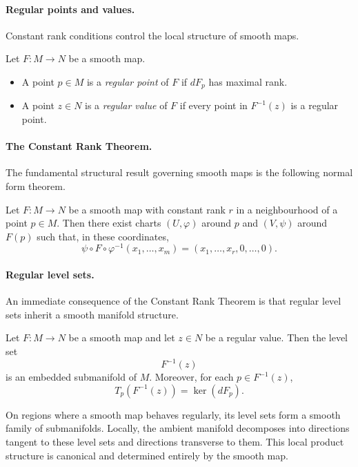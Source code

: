 \paragraph{Regular points and values.}
Constant rank conditions control the local structure of smooth maps.

\begin{gdefn}
Let $F:M\to N$ be a smooth map.
\begin{itemize}
\item A point $p\in M$ is a \emph{regular point} of $F$ if $dF_p$ has maximal rank.
\item A point $z\in N$ is a \emph{regular value} of $F$ if every point in $F^{-1}(z)$
is a regular point.
\end{itemize}
\end{gdefn}

\paragraph{The Constant Rank Theorem.}
The fundamental structural result governing smooth maps is the following normal form
theorem.

\begin{gthm}
Let $F:M\to N$ be a smooth map with constant rank $r$ in a neighbourhood of a point
$p\in M$.
Then there exist charts $(U,\varphi)$ around $p$ and $(V,\psi)$ around $F(p)$ such that,
in these coordinates,
\[
\psi\circ F\circ \varphi^{-1}(x_1,\dots,x_m)
=
(x_1,\dots,x_r,0,\dots,0).
\]
\end{gthm}


\paragraph{Regular level sets.}
An immediate consequence of the Constant Rank Theorem is that regular level sets inherit
a smooth manifold structure.

\begin{gprop}
Let $F:M\to N$ be a smooth map and let $z\in N$ be a regular value.
Then the level set
\[
F^{-1}(z)
\]
is an embedded submanifold of $M$.
Moreover, for each $p\in F^{-1}(z)$,
\[
T_p(F^{-1}(z)) = \ker(dF_p).
\]
\end{gprop}

On regions where a smooth map behaves regularly, its level sets form a smooth family of
submanifolds.
Locally, the ambient manifold decomposes into directions tangent to these level sets and
directions transverse to them.
This local product structure is canonical and determined entirely by the smooth map.


